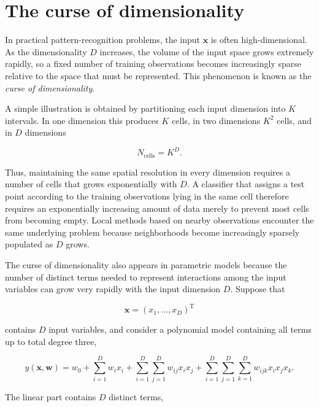\documentclass[10pt,twocolumn]{memoir}
\begin{document}
\section{The curse of dimensionality}

In practical pattern-recognition problems, the input $\mathbf{x}$ is often high-dimensional. As the dimensionality $D$ increases, the volume of the input space grows extremely rapidly, so a fixed number of training observations becomes increasingly sparse relative to the space that must be represented. This phenomenon is known as the \textit{curse of dimensionality}.

A simple illustration is obtained by partitioning each input dimension into $K$ intervals. In one dimension this produces $K$ cells, in two dimensions $K^2$ cells, and in $D$ dimensions

\begin{equation}
    N_{\mathrm{cells}} = K^D.
\end{equation}

Thus, maintaining the same spatial resolution in every dimension requires a number of cells that grows exponentially with $D$. A classifier that assigns a test point according to the training observations lying in the same cell therefore requires an exponentially increasing amount of data merely to prevent most cells from becoming empty. Local methods based on nearby observations encounter the same underlying problem because neighborhoods become increasingly sparsely populated as $D$ grows.

The curse of dimensionality also appears in parametric models because the number of distinct terms needed to represent interactions among the input variables can grow very rapidly with the input dimension $D$. Suppose that

\begin{equation}
    \mathbf{x} = (x_1,\ldots,x_D)^{\mathrm{T}}
\end{equation}

contains $D$ input variables, and consider a polynomial model containing all terms up to total degree three,

\begin{equation}
    y(\mathbf{x},\mathbf{w}) = w_0 + \sum_{i=1}^{D} w_i x_i + \sum_{i=1}^{D}\sum_{j=1}^{D} w_{ij}x_i x_j + \sum_{i=1}^{D}\sum_{j=1}^{D}\sum_{k=1}^{D}w_{ijk}x_i x_j x_k.
\end{equation}

The linear part contains $D$ distinct terms,
\end{document}
